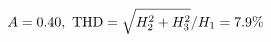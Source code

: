 \documentclass[preview]{standalone}
\begin{document}
\begin{align*}
\special{dvisvgm:raw <g id='unique000'>}A=0.40,\ \text{THD}=\sqrt{H_2^2+H_3^2}/H_1=7.9\%\special{dvisvgm:raw </g>}
\end{align*}
\end{document}
